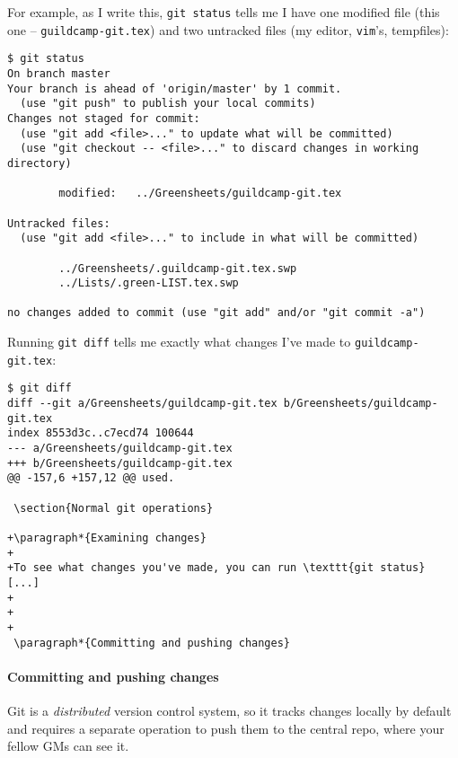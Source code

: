 \documentclass[green]{testgame}
\begin{document}
For example, as I write this, \texttt{git status} tells me I have one modified file (this one -- \texttt{guildcamp-git.tex}) and two untracked files (my editor, \texttt{vim}'s, tempfiles):
\begin{verbatim}
$ git status
On branch master
Your branch is ahead of 'origin/master' by 1 commit.
  (use "git push" to publish your local commits)
Changes not staged for commit:
  (use "git add <file>..." to update what will be committed)
  (use "git checkout -- <file>..." to discard changes in working directory)

        modified:   ../Greensheets/guildcamp-git.tex

Untracked files:
  (use "git add <file>..." to include in what will be committed)

        ../Greensheets/.guildcamp-git.tex.swp
        ../Lists/.green-LIST.tex.swp

no changes added to commit (use "git add" and/or "git commit -a")
\end{verbatim}

Running \texttt{git diff} tells me exactly what changes I've made to \texttt{guildcamp-git.tex}:
\begin{verbatim}
$ git diff
diff --git a/Greensheets/guildcamp-git.tex b/Greensheets/guildcamp-git.tex
index 8553d3c..c7ecd74 100644
--- a/Greensheets/guildcamp-git.tex
+++ b/Greensheets/guildcamp-git.tex
@@ -157,6 +157,12 @@ used.

 \section{Normal git operations}

+\paragraph*{Examining changes}
+
+To see what changes you've made, you can run \texttt{git status} [...]
+
+
+
 \paragraph*{Committing and pushing changes}
\end{verbatim}

\paragraph*{Committing and pushing changes}

Git is a \emph{distributed} version control system, so it tracks changes locally by default and requires a separate operation to push them to the central repo, where your fellow GMs can see it.
\end{document}
